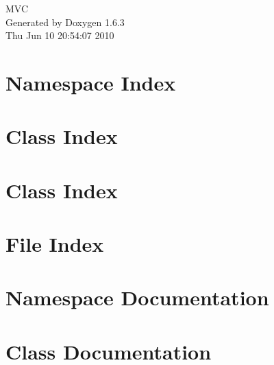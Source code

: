 \documentclass[a4paper]{book}
\begin{document}
\hypersetup{pageanchor=false}
\begin{titlepage}
\vspace*{7cm}
\begin{center}
{\Large MVC }\\
\vspace*{1cm}
{\large Generated by Doxygen 1.6.3}\\
\vspace*{0.5cm}
{\small Thu Jun 10 20:54:07 2010}\\
\end{center}
\end{titlepage}
\clearemptydoublepage
{}
\tableofcontents
\clearemptydoublepage
{}
\hypersetup{pageanchor=true}
\chapter{Namespace Index}

\chapter{Class Index}

\chapter{Class Index}

\chapter{File Index}

\chapter{Namespace Documentation}

\chapter{Class Documentation}






































\end{document}
